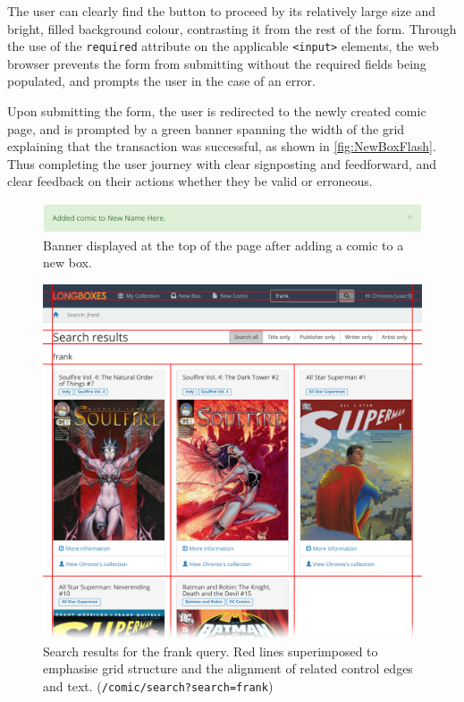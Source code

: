 \documentclass[fontsize=12pt,a4paper]{scrreprt}
\begin{document}
The user can clearly find the button to proceed by its relatively large size and bright, filled background colour, contrasting it from the rest of the form. Through the use of the \texttt{required} attribute on the applicable \texttt{<input>} elements, the web browser prevents the form from submitting without the required fields being populated, and prompts the user in the case of an error.

Upon submitting the form, the user is redirected to the newly created comic page, and is prompted by a green banner spanning the width of the grid explaining that the transaction was successful, as shown in \autoref{fig:NewBoxFlash}. Thus completing the user journey with clear signposting and feedforward, and clear feedback on their actions whether they be valid or erroneous.

\begin{figure}[b]
  \centering
  \includegraphics[width=\textwidth]{new_box_flash.png}
  \caption{
    Banner displayed at the top of the page after adding a comic to a new box.
  }
  \label{fig:NewBoxFlash}
\end{figure}


\newpage
\begin{figure}[p]
  \centering
  \includegraphics[width=\textwidth]{search_results.png}
  \caption{
    Search results for the \textsf{frank} query. Red lines superimposed to emphasise grid structure and the alignment of related control edges and text.
    (\texttt{/comic/search?search=frank})
  }
  \label{fig:SearchResultGrid}
\end{figure}
\FloatBarrier
\end{document}
